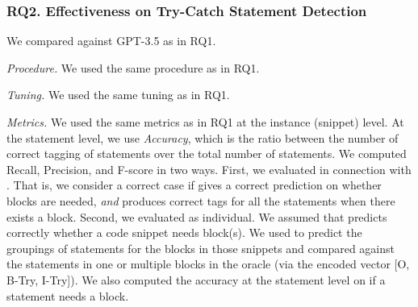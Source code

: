\subsubsection{RQ2. Effectiveness on Try-Catch Statement Detection}
 We compared {\xstate} against GPT-3.5 as in RQ1.


{\em Procedure.} We used the same procedure as in RQ1.

{\em Tuning.} We used the same tuning as in RQ1.

{\em Metrics.} We used the same metrics as in RQ1 at the instance (snippet)
level.  At the statement level, we use {\em Accuracy}, which is the
ratio between the number of correct tagging of statements over the
total number of statements. We computed Recall, Precision,
and F-score in two ways. First, we evaluated {\xstate} in connection
with {\xblock}. That is, we consider a correct case if {\xblock} gives
a correct prediction on whether
 blocks are needed, {\em and} {\xstate} produces
correct tags for all the statements when there exists
a  block. Second, we evaluated {\xstate} as
individual. We assumed that {\xblock} predicts correctly whether a
code snippet needs  block(s). We used {\xstate} to
predict the groupings of statements for the blocks in those snippets
and compared against the statements in one or multiple blocks in the oracle (via
the encoded vector [O, B-Try, I-Try]). We also computed the accuracy
at the statement level on if a statement needs a 
block.



